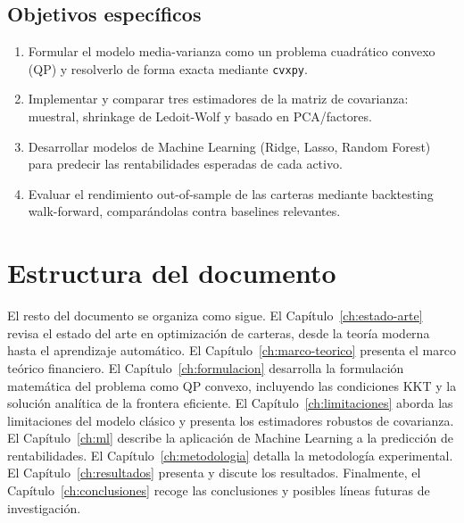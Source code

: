 \subsection{Objetivos específicos}

\begin{enumerate}
    \item Formular el modelo media-varianza como un problema cuadrático
          convexo (QP) y resolverlo de forma exacta mediante \texttt{cvxpy}.
    \item Implementar y comparar tres estimadores de la matriz de covarianza:
          muestral, shrinkage de Ledoit-Wolf y basado en PCA/factores.
    \item Desarrollar modelos de Machine Learning (Ridge, Lasso, Random Forest)
          para predecir las rentabilidades esperadas de cada activo.
    \item Evaluar el rendimiento out-of-sample de las carteras mediante
          backtesting walk-forward, comparándolas contra baselines relevantes.
\end{enumerate}

\section{Estructura del documento}

El resto del documento se organiza como sigue. El Capítulo~\ref{ch:estado-arte}
revisa el estado del arte en optimización de carteras, desde la teoría moderna
hasta el aprendizaje automático. El Capítulo~\ref{ch:marco-teorico}
presenta el marco teórico financiero. El Capítulo~\ref{ch:formulacion} desarrolla
la formulación matemática del problema como QP convexo, incluyendo las
condiciones KKT y la solución analítica de la frontera eficiente. El
Capítulo~\ref{ch:limitaciones} aborda las limitaciones del modelo clásico
y presenta los estimadores robustos de covarianza. El Capítulo~\ref{ch:ml}
describe la aplicación de Machine Learning a la predicción de rentabilidades.
El Capítulo~\ref{ch:metodologia} detalla la metodología experimental. El
Capítulo~\ref{ch:resultados} presenta y discute los resultados. Finalmente,
el Capítulo~\ref{ch:conclusiones} recoge las conclusiones y posibles líneas
futuras de investigación.
